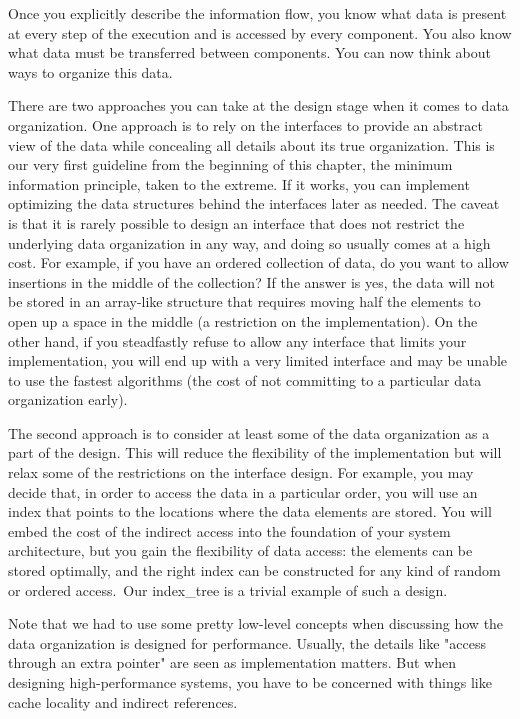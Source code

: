 Once you explicitly describe the information flow, you know what data is present at every step of the execution and is accessed by every component. You also know what data must be transferred between components. You can now think about ways to organize this data.

There are two approaches you can take at the design stage when it comes to data organization. One approach is to rely on the interfaces to provide an abstract view of the data while concealing all details about its true organization. This is our very first guideline from the beginning of this chapter, the minimum information principle, taken to the extreme. If it works, you can implement optimizing the data structures behind the interfaces later as needed. The caveat is that it is rarely possible to design an interface that does not restrict the underlying data organization in any way, and doing so usually comes at a high cost. For example, if you have an ordered collection of data, do you want to allow insertions in the middle of the collection? If the answer is yes, the data will not be stored in an array-like structure that requires moving half the elements to open up a space in the middle (a restriction on the implementation). On the other hand, if you steadfastly refuse to allow any interface that limits your implementation, you will end up with a very limited interface and may be unable to use the fastest algorithms (the cost of not committing to a particular data organization early).

The second approach is to consider at least some of the data organization as a part of the design. This will reduce the flexibility of the implementation but will relax some of the restrictions on the interface design. For example, you may decide that, in order to access the data in a particular order, you will use an index that points to the locations where the data elements are stored. You will embed the cost of the indirect access into the foundation of your system architecture, but you gain the flexibility of data access: the elements can be stored optimally, and the right index can be constructed for any kind of random or ordered access. Our index\_tree is a trivial example of such a design. 

Note that we had to use some pretty low-level concepts when discussing how the data organization is designed for performance. Usually, the details like "access through an extra pointer" are seen as implementation matters. But when designing high-performance systems, you have to be concerned with things like cache locality and indirect references. 

